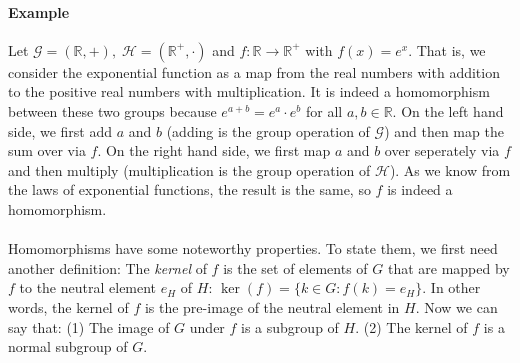 \paragraph{Example}
Let  $\mathcal{G} = (\mathbb{R}, +), \; \mathcal{H} = (\mathbb{R}^+, \cdot)$ and $f: \mathbb{R} \rightarrow \mathbb{R}^+$ with $f(x) = e^x$. That is, we consider the exponential function as a map from the real numbers with addition to the positive real numbers with multiplication. It is indeed a homomorphism between these two groups because $e^{a+b} = e^a \cdot e^b$ for all $a,b \in \mathbb{R}$. On the left hand side, we first add $a$ and $b$ (adding is the group operation of $\mathcal{G}$) and then map the sum over via $f$. On the right hand side, we first map $a$ and $b$ over seperately via $f$ and then multiply (multiplication is the group operation of $\mathcal{H}$). As we know from the laws of exponential functions, the result is the same, so $f$ is indeed a homomorphism.




\paragraph{} Homomorphisms have some noteworthy properties. To state them, we first need another definition: The \emph{kernel} of $f$ is the set of elements of $G$ that are mapped by $f$ to the neutral element $e_H$ of $H$: $\ker(f) = \{ k \in G: f(k) = e_H \}$. In other words, the kernel of $f$ is the pre-image of the neutral element in $H$. Now we can say that: (1) The image of $G$ under $f$ is a subgroup of $H$. (2)  The kernel of $f$ is a normal subgroup of $G$.




